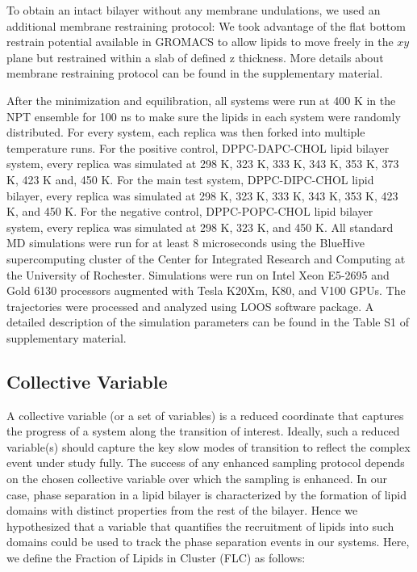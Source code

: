 \documentclass{biophys-new}
\begin{document}
To obtain an intact bilayer without any membrane undulations, we used an additional membrane restraining protocol: 
We took advantage of the flat bottom restrain potential available in GROMACS to allow lipids to move freely in the $xy$ plane but restrained within a slab of
defined z thickness.
More details about membrane restraining protocol can be found in the supplementary material.

After the minimization and equilibration, all systems were run at 400 K in the NPT ensemble for 100 ns to make sure the lipids in each system were
randomly distributed.
For every system, each replica was then forked into multiple temperature runs. 
For the positive control, DPPC-DAPC-CHOL lipid bilayer system, every replica was simulated at 298 K, 323 K, 333 K, 343 K, 353 K, 373 K, 423 K and, 450 K. 
For the main test system, DPPC-DIPC-CHOL lipid bilayer, every replica was simulated at 298 K, 323 K, 333 K, 343 K, 353 K, 423 K, and 450 K. 
For the negative control, DPPC-POPC-CHOL lipid bilayer system, every replica was simulated at 298 K, 323 K, and 450 K.
All standard MD simulations were run for at least 8 microseconds using the BlueHive supercomputing cluster of the Center for Integrated Research and
Computing at the University of Rochester. Simulations were run on Intel Xeon E5-2695 and Gold 6130 processors augmented with Tesla K20Xm, K80, and V100 GPUs.   
The trajectories were processed and analyzed using LOOS software package.
A detailed description of the simulation parameters can be found in the Table S1 of supplementary material.  

\subsection*{Collective Variable}

A collective variable (or a set of variables) is a reduced coordinate that captures the progress of a system along the transition of interest.
Ideally, such a reduced variable(s) should capture the key slow modes of transition to reflect the complex event under study fully.
The success of any enhanced sampling protocol depends on the chosen collective variable over which the sampling is enhanced. 
In our case, phase separation in a lipid bilayer is characterized by the formation of lipid domains with distinct properties from the rest of the bilayer.
Hence we hypothesized that a variable that quantifies the recruitment of lipids into such domains could be used to track the phase separation
events in our systems. Here, we define the Fraction of Lipids in Cluster (FLC) as follows:
\end{document}
